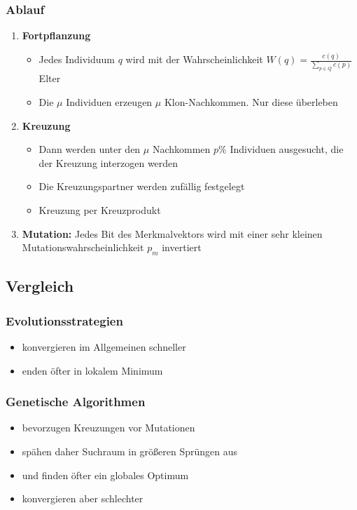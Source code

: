 \subsubsection{Ablauf}
\begin{enumerate}
	\item \textbf{Fortpflanzung}
	\begin{itemize}
		\item Jedes Individuum \(q\) wird mit der Wahrscheinlichkeit \(W(q) = \frac{c(q)}{\sum_{p \in Q}c(p)}\) Elter
		\item Die \(\mu\) Individuen erzeugen \(\mu\) Klon-Nachkommen. Nur diese überleben
	\end{itemize}
	\item \textbf{Kreuzung}
	\begin{itemize}
		\item Dann werden unter den \(\mu\) Nachkommen \(p\%\) Individuen ausgesucht, die der Kreuzung interzogen werden
		\item Die Kreuzungspartner werden zufällig festgelegt
		\item Kreuzung per Kreuzprodukt
	\end{itemize}
	\item \textbf{Mutation:} Jedes Bit des Merkmalvektors wird mit einer sehr kleinen Mutationswahrscheinlichkeit \(p_m\) invertiert
\end{enumerate}


\subsection{Vergleich}

\subsubsection{Evolutionsstrategien}
\begin{itemize}
	\item konvergieren im Allgemeinen schneller
	\item enden öfter in lokalem Minimum
\end{itemize}

\subsubsection{Genetische Algorithmen}
\begin{itemize}
	\item bevorzugen Kreuzungen vor Mutationen
	\item spähen daher Suchraum in größeren Sprüngen aus
	\item und finden öfter ein globales Optimum
	\item konvergieren aber schlechter
\end{itemize}


